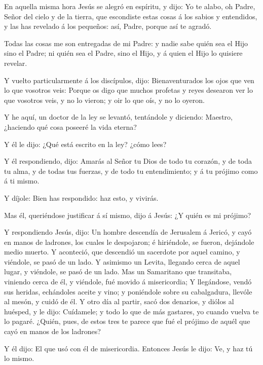  En aquella misma hora Jesús se alegró en espíritu, y dijo:
Yo te alabo, oh Padre, Señor del cielo y de la tierra, que escondiste
estas cosas á los sabios y entendidos, y las has revelado á los
pequeños: así, Padre, porque así te agradó.

 Todas las cosas me son entregadas de mi Padre: y nadie
sabe quién sea el Hijo sino el Padre; ni quién sea el Padre, sino el
Hijo, y á quien el Hijo lo quisiere revelar.

 Y vuelto particularmente á los discípulos, dijo:
Bienaventurados los ojos que ven lo que vosotros veis: 
Porque os digo que muchos profetas y reyes desearon ver lo que vosotros
veis, y no lo vieron; y oir lo que oís, y no lo oyeron.

 Y he aquí, un doctor de la ley se levantó, tentándole y
diciendo: Maestro, ¿haciendo qué cosa poseeré la vida eterna?

 Y él le dijo: ¿Qué está escrito en la ley? ¿cómo lees?

 Y él respondiendo, dijo: Amarás al Señor tu Dios de todo
tu corazón, y de toda tu alma, y de todas tus fuerzas, y de todo tu
entendimiento; y á tu prójimo como á ti mismo.

 Y díjole: Bien has respondido: haz esto, y vivirás.

 Mas él, queriéndose justificar á sí mismo, dijo á Jesús:
¿Y quién es mi prójimo?

 Y respondiendo Jesús, dijo: Un hombre descendía de
Jerusalem á Jericó, y cayó en manos de ladrones, los cuales le
despojaron; é hiriéndole, se fueron, dejándole medio muerto.
 Y aconteció, que descendió un sacerdote por aquel camino,
y viéndole, se pasó de un lado.  Y asimismo un Levita,
llegando cerca de aquel lugar, y viéndole, se pasó de un lado.
 Mas un Samaritano que transitaba, viniendo cerca de él, y
viéndole, fué movido á misericordia;  Y llegándose, vendó
sus heridas, echándoles aceite y vino; y poniéndole sobre su
cabalgadura, llevóle al mesón, y cuidó de él.  Y otro día
al partir, sacó dos denarios, y diólos al huésped, y le dijo: Cuídamele;
y todo lo que de más gastares, yo cuando vuelva te lo pagaré.
 ¿Quién, pues, de estos tres te parece que fué el prójimo
de aquél que cayó en manos de los ladrones?

 Y él dijo: El que usó con él de misericordia. Entonces
Jesús le dijo: Ve, y haz tú lo mismo.

